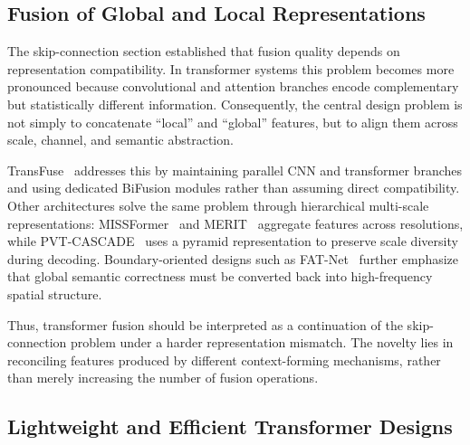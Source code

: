 \documentclass[5p,times,authoryear]{elsarticle}
\begin{document}
\subsection{Fusion of Global and Local Representations}


The skip-connection section established that fusion quality depends on representation compatibility. In transformer systems this problem becomes more pronounced because convolutional and attention branches encode complementary but statistically different information. Consequently, the central design problem is not simply to concatenate ``local'' and ``global'' features, but to align them across scale, channel, and semantic abstraction.

TransFuse~\citep{reviewfix_zhang2021transfuse} addresses this by maintaining parallel CNN and transformer branches and using dedicated BiFusion modules rather than assuming direct compatibility. Other architectures solve the same problem through hierarchical multi-scale representations: MISSFormer~\citep{reviewfix_huang2021missformer} and MERIT~\citep{reviewfix_rahman2024merit} aggregate features across resolutions, while PVT-CASCADE~\citep{reviewfix_rahman2023cascade} uses a pyramid representation to preserve scale diversity during decoding. Boundary-oriented designs such as FAT-Net~\citep{wu2022fatnet} further emphasize that global semantic correctness must be converted back into high-frequency spatial structure.

Thus, transformer fusion should be interpreted as a continuation of the skip-connection problem under a harder representation mismatch. The novelty lies in reconciling features produced by different context-forming mechanisms, rather than merely increasing the number of fusion operations.


\subsection{Lightweight and Efficient Transformer Designs}
\end{document}
